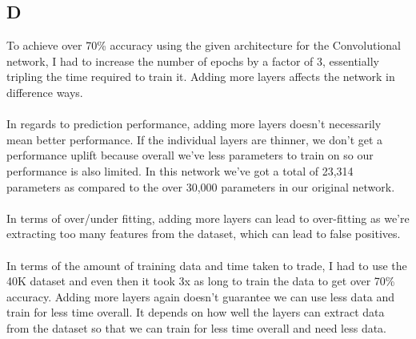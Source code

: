 \documentclass[11pt]{article} %
\begin{document}
\subsection{D}
To achieve over 70\% accuracy using the given architecture for the Convolutional network, I had to increase the number of epochs by a factor of 3, essentially tripling the time required to train it.  Adding more layers affects the network in difference ways. \\\\In regards to  prediction performance,  adding more layers doesn't necessarily mean better performance.  If the individual layers are thinner,  we don't get a performance uplift because overall we've less parameters to train on so our performance is also limited.  In this network we've got a total of 23,314 parameters as compared to the over 30,000 parameters in our original network.
\\\\In terms of over/under fitting,  adding more layers can lead to over-fitting as we're extracting too many features from the dataset, which can lead to false positives.  \\\\ In terms of the amount of training data and time taken to trade,  I had to use the 40K dataset and even then it took 3x as long to train the data to get over 70\% accuracy.  Adding more layers again doesn't guarantee we can use less data and train for less time overall.  It depends on how well the layers can extract data from the dataset so that we can train for less time overall and need less data. 
\end{document}
